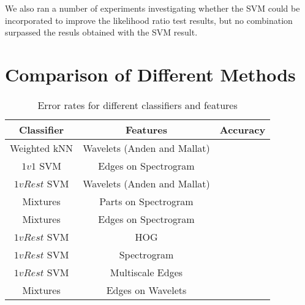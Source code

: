 \documentclass{article}
\begin{document}
We also ran a number of experiments investigating whether the SVM could be incorporated to improve the likelihood ratio test results, 
but no combination surpassed the resuls obtained with the
SVM result.

\section{Comparison of Different Methods}

\begin{table}[h]
  \centering
  \begin{tabular}{| c | c | c |}
    \hline
     Classifier & Features & Accuracy \\ \hline\hline
     Weighted kNN & Wavelets (Anden and Mallat) &  \\
     \hline
     $1v1$ SVM & Edges on Spectrogram  &  \\
     \hline
     $1vRest$ SVM & Wavelets (Anden and Mallat) &  \\
     \hline
     Mixtures & Parts on Spectrogram &  \\
     \hline
     Mixtures & Edges on Spectrogram &  \\
     \hline
     $1vRest$ SVM & HOG &  \\
     \hline
     $1vRest$ SVM & Spectrogram &  \\
     \hline
     $1vRest$ SVM & Multiscale Edges &  \\
     \hline
     Mixtures & Edges on Wavelets &  \\
     \hline

  \end{tabular}
  \caption{Error rates for different classifiers and features}
  \label{tab:comparison}
\end{table}
\end{document}

